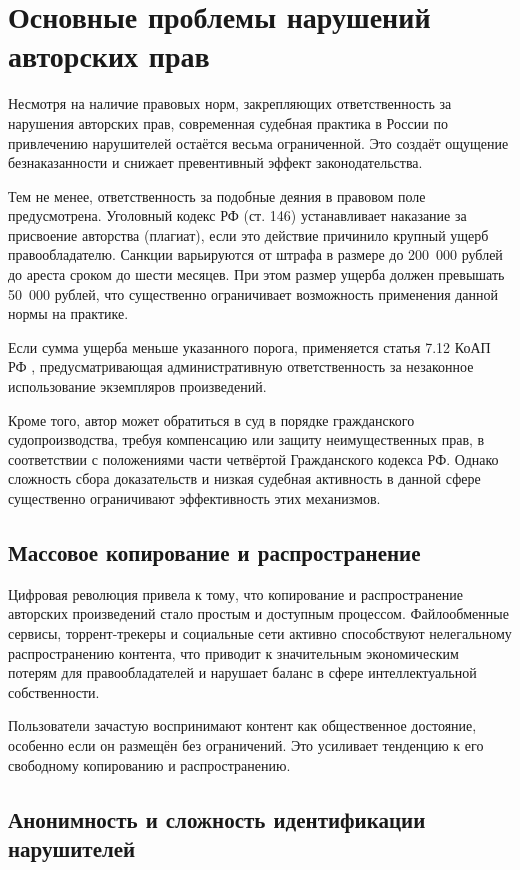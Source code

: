 \section{Основные проблемы нарушений авторских прав}

Несмотря на наличие правовых норм, закрепляющих ответственность за нарушения авторских прав,
современная судебная практика в России по привлечению нарушителей остаётся весьма
ограниченной. Это создаёт ощущение безнаказанности и снижает превентивный эффект
законодательства.

Тем не менее, ответственность за подобные деяния в правовом поле предусмотрена. Уголовный
кодекс РФ (ст. 146) \cite{UKRF146} устанавливает наказание за присвоение авторства (плагиат), если это
действие причинило крупный ущерб правообладателю. Санкции варьируются от штрафа в размере до
200~000 рублей до ареста сроком до шести месяцев. При этом размер ущерба должен превышать
50~000 рублей, что существенно ограничивает возможность применения данной нормы на практике.

Если сумма ущерба меньше указанного порога, применяется статья 7.12 КоАП РФ \cite{KOAP712},
предусматривающая административную ответственность за незаконное использование экземпляров
произведений.

Кроме того, автор может обратиться в суд в порядке гражданского судопроизводства, требуя
компенсацию или защиту неимущественных прав, в соответствии с положениями части четвёртой
Гражданского кодекса РФ. Однако сложность сбора доказательств и низкая судебная активность
в данной сфере существенно ограничивают эффективность этих механизмов.

\subsection{Массовое копирование и распространение}

Цифровая революция привела к тому, что копирование и распространение авторских
произведений стало простым и доступным процессом. Файлообменные сервисы, торрент-трекеры
и социальные сети активно способствуют нелегальному распространению контента, что
приводит к значительным экономическим потерям для правообладателей и нарушает баланс в
сфере интеллектуальной собственности.

Пользователи зачастую воспринимают контент как общественное достояние, особенно если он
размещён без ограничений. Это усиливает тенденцию к его свободному копированию и
распространению.

\subsection{Анонимность и сложность идентификации нарушителей}

